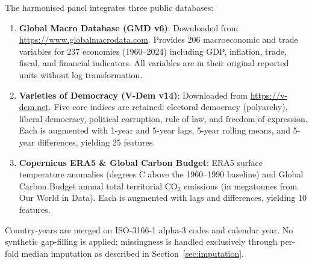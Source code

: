 \documentclass[11pt,a4paper]{article}
\begin{document}
The harmonised panel integrates three public databases:

\begin{enumerate}[leftmargin=*, label=\arabic*.]
    \item \textbf{Global Macro Database (GMD v6)}: Downloaded from \url{https://www.globalmacrodata.com}. Provides 206 macroeconomic and trade variables for 237 economies (1960--2024) including GDP, inflation, trade, fiscal, and financial indicators. All variables are in their original reported units without log transformation.
    \item \textbf{Varieties of Democracy (V-Dem v14)}: Downloaded from \url{https://v-dem.net}. Five core indices are retained: electoral democracy (polyarchy), liberal democracy, political corruption, rule of law, and freedom of expression. Each is augmented with 1-year and 5-year lags, 5-year rolling means, and 5-year differences, yielding 25 features.
    \item \textbf{Copernicus ERA5 \& Global Carbon Budget}: ERA5 surface temperature anomalies (degrees C above the 1960--1990 baseline) and Global Carbon Budget annual total territorial CO$_2$ emissions (in megatonnes from Our World in Data). Each is augmented with lags and differences, yielding 10 features.
\end{enumerate}

Country-years are merged on ISO-3166-1 alpha-3 codes and calendar year. No synthetic gap-filling is applied; missingness is handled exclusively through per-fold median imputation as described in Section~\ref{sec:imputation}.
\end{document}
